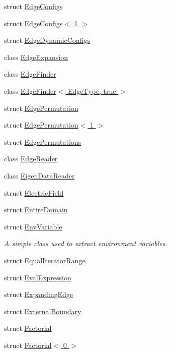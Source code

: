 \begin{DoxyCompactItemize}
struct \hyperlink{structmodel_1_1_edge_configs}{Edge\+Configs}
\item 
struct \hyperlink{structmodel_1_1_edge_configs_3_011_01_4}{Edge\+Configs$<$ 1 $>$}
\item 
struct \hyperlink{structmodel_1_1_edge_dynamic_configs}{Edge\+Dynamic\+Configs}
\item 
class \hyperlink{classmodel_1_1_edge_expansion}{Edge\+Expansion}
\item 
class \hyperlink{classmodel_1_1_edge_finder}{Edge\+Finder}
\item 
class \hyperlink{classmodel_1_1_edge_finder_3_01_edge_type_00_01true_01_4}{Edge\+Finder$<$ Edge\+Type, true $>$}
\item 
struct \hyperlink{structmodel_1_1_edge_permutation}{Edge\+Permutation}
\item 
struct \hyperlink{structmodel_1_1_edge_permutation_3_011_01_4}{Edge\+Permutation$<$ 1 $>$}
\item 
struct \hyperlink{structmodel_1_1_edge_permutations}{Edge\+Permutations}
\item 
class \hyperlink{classmodel_1_1_edge_reader}{Edge\+Reader}
\item 
class \hyperlink{classmodel_1_1_eigen_data_reader}{Eigen\+Data\+Reader}
\item 
struct \hyperlink{structmodel_1_1_electric_field}{Electric\+Field}
\item 
struct \hyperlink{structmodel_1_1_entire_domain}{Entire\+Domain}
\item 
struct \hyperlink{structmodel_1_1_env_variable}{Env\+Variable}
\begin{DoxyCompactList}\small\item\em A simple class used to extract environment variables. \end{DoxyCompactList}\item 
struct \hyperlink{structmodel_1_1_equal_iterator_range}{Equal\+Iterator\+Range}
\item 
struct \hyperlink{structmodel_1_1_eval_expression}{Eval\+Expression}
\item 
struct \hyperlink{structmodel_1_1_expanding_edge}{Expanding\+Edge}
\item 
struct \hyperlink{structmodel_1_1_external_boundary}{External\+Boundary}
\item 
struct \hyperlink{structmodel_1_1_factorial}{Factorial}
\item 
struct \hyperlink{structmodel_1_1_factorial_3_010_01_4}{Factorial$<$ 0 $>$}
\item 

\end{DoxyCompactItemize}
